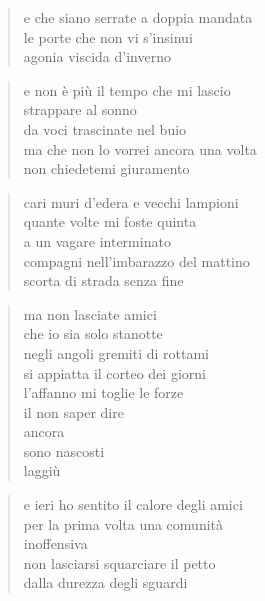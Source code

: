 	\begin{verse}
		e che siano serrate a doppia mandata\\
		le porte che non vi s'insinui\\
		agonia viscida d'inverno
	\end{verse}

	\begin{verse}
		e non è più il tempo che mi lascio\\
		strappare al sonno\\
		da voci trascinate nel buio\\
		ma che non lo vorrei ancora una volta\\
		non chiedetemi giuramento
	\end{verse}

\clearpage


	\begin{verse}
		cari muri d’edera e vecchi lampioni\\
		quante volte mi foste quinta\\
		a un vagare interminato\\
		compagni nell’imbarazzo del mattino\\
		scorta di strada senza fine
	\end{verse}

	\begin{verse}
		ma non lasciate amici\\
		che io sia solo stanotte\\
		negli angoli gremiti di rottami\\
		si appiatta il corteo dei giorni\\
		l’affanno mi toglie le forze\\
		il non saper dire\\
		ancora\\
		sono nascosti\\
		laggiù
	\end{verse}

	\begin{verse}
		e ieri ho sentito il calore degli amici\\
		per la prima volta una comunità\\
		inoffensiva\\
		non lasciarsi squarciare il petto\\
		dalla durezza degli sguardi
	\end{verse}

\clearpage

